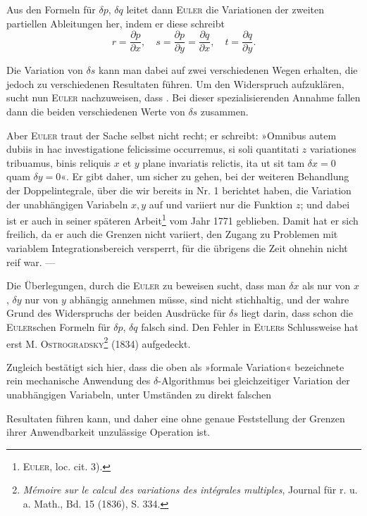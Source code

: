 Aus den Formeln für $\delta p$, $\delta q$ leitet dann \textsc{Euler} die Variationen der zweiten
partiellen Ableitungen her, indem er diese schreibt
\[
r=\frac{\partial p}{\partial x},\quad s=\frac{\partial p}{\partial y}=\frac{\partial q}{\partial x},\quad t=\frac{\partial q}{\partial y}.
\]

Die Variation von $\delta s$ kann man dabei auf zwei verschiedenen Wegen
erhalten, die jedoch zu verschiedenen Resultaten führen. Um den Widerspruch
aufzuklären, sucht nun \textsc{Euler} nachzuweisen, dass . Bei dieser spezialisierenden Annahme fallen dann die
beiden verschiedenen Werte von $\delta s$ zusammen.

Aber \textsc{Euler} traut der Sache selbst nicht recht; er schreibt: »Omnibus
autem dubiis in hac investigatione felicissime occurremus, si soli quantitati $z$
variationes tribuamus, binis reliquis $x$ et $y$ plane invariatis relictis, ita ut sit
tam $\delta x=0$ quam $\delta y=0$«. Er gibt daher, um sicher zu gehen, bei der
weiteren Behandlung der Doppelintegrale, über die wir bereits in Nr. 1 berichtet
haben, die Variation der unabhängigen Variabeln $x,y$ auf und variiert
nur die Funktion $z$; und dabei ist er auch in seiner späteren Arbeit\footnote{\textsc{Euler}, loc. cit. 3).} vom
Jahr 1771 geblieben. Damit hat er sich freilich, da er auch die Grenzen
nicht variiert, den Zugang zu Problemen mit variablem Integrationsbereich
versperrt, für die übrigens die Zeit ohnehin nicht reif war. —

Die Überlegungen, durch die \textsc{Euler} zu beweisen sucht, dass man $\delta x$ als
nur von $x$, $\delta y$ nur von $y$ abhängig annehmen müsse, sind nicht stichhaltig,
und der wahre Grund des Widerspruchs der beiden Ausdrücke für $\delta s$ liegt
darin, dass schon die \textsc{Euler}schen Formeln für $\delta p$, $\delta q$ falsch sind. Den Fehler
in \textsc{Euler}s Schlussweise hat erst \textsc{M. Ostrogradsky}\footnote{\textit{Mémoire sur le calcul des variations des intégrales multiples}, Journal für r. u. a. Math., Bd. 15 (1836), S. 334.} (1834) aufgedeckt.

Zugleich bestätigt sich hier, dass die oben als »formale Variation« bezeichnete
rein mechanische Anwendung des $\delta$-Algorithmus bei gleichzeitiger
Variation der unabhängigen Variabeln, unter Umständen zu direkt falschen
\par\clearpage{}
\noindent Resultaten führen kann, und daher eine ohne genaue Feststellung der Grenzen
ihrer Anwendbarkeit unzulässige Operation ist.

